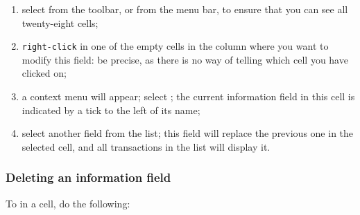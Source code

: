 \begin{enumerate}
	\item select  from the toolbar, or  from the menu bar, to ensure that you can see all twenty-eight cells;
	\item \texttt{right-click} in one of the empty cells in the column where you want to modify this field: be precise, as there is no way of telling which cell you have clicked on;
	\item a context menu will appear; select ; the current information field in this cell is indicated by a tick to the left of its name;
	\item select another field from the list; this field will replace the previous one in the selected cell, and all transactions in the list will display it.
\end{enumerate}


\subsubsection{Deleting an information field\label{transactions-list-fields-remove}}

To  in a cell, do the following:

